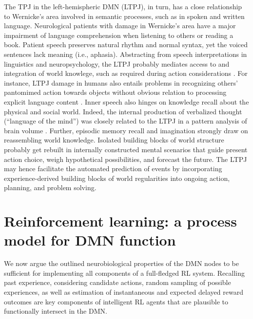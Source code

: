 \documentclass[10pt,letterpaper]{article}
\begin{document}
The TPJ in the left-hemispheric DMN (LTPJ),
in turn, has a close relationship to Wernicke's area
involved in semantic processes, such as in spoken and written language.
Neurological patients with damage in Wernicke's area
have a major impairment of language comprehension
when listening to others or reading a book.
Patient speech
preserves natural rhythm and normal syntax, yet the
voiced sentences lack meaning (i.e., aphasia).
Abstracting from speech interpretations in linguistics
and neuropsychology,
the LTPJ probably mediates access to and integration of world knowlege,
such as required during action considerations
\citep{binder2011neurobiology, seghier2013angular}.
For instance, LTPJ damage in humans also entails problems in recognizing
others' pantomimed action towards objects
without obvious relation to processing explicit language content
\citep{varney1987locus}.
%
Inner speech also hinges on knowledge recall
about the physical and social world.
Indeed,
the internal production of
verbalized thought (``language of the mind'') was closely related to the LTPJ
in a pattern analysis of brain volume
\citep{geva2011neural}.
Further,
episodic memory recall and imagination strongly draw on
reassembling world knowledge.
Isolated building blocks of world structure probably get rebuilt
in internally constructed mental scenarios that
guide present action choice,
weigh hypothetical possibilities, and forecast the future.
%
The LTPJ may hence facilitate the automated prediction of events
by incorporating experience-derived building blocks of world regularities
into ongoing action, planning, and problem solving.



\section{Reinforcement learning: a process model for DMN function}
We now argue the outlined neurobiological properties
of the DMN nodes
to be sufficient for implementing all components
of a full-fledged RL system.
Recalling past experience, considering candidate actions,
random sampling of possible experiences, as well as
estimation of instantaneous and expected delayed reward outcomes
are key components of intelligent RL agents
that are plausible to functionally intersect in the DMN.
\end{document}
